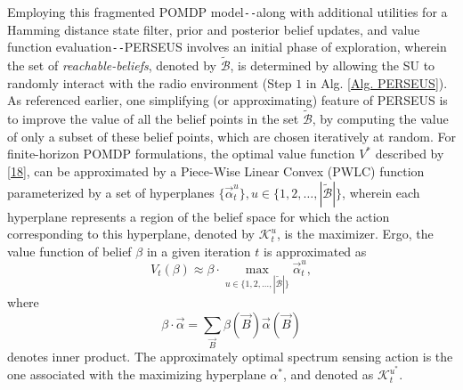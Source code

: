 \documentclass[10pt, twocolumn]{IEEEtran}
\begin{document}
Employing this fragmented POMDP model\texttt{-{}-}along with additional utilities for a Hamming distance state filter, prior and posterior belief updates, and value function evaluation\texttt{-{}-}PERSEUS involves an initial phase of exploration, wherein the set of \emph{reachable-beliefs}, denoted by $\tilde{\mathcal{B}}$, is determined by allowing the SU to randomly interact with the radio environment (Step $1$ in Alg. \ref{Alg. PERSEUS}). As referenced earlier, one simplifying (or approximating) feature of PERSEUS is to improve the value of all the belief points in the set $\tilde{\mathcal{B}}$, by computing the value of only a subset of these belief points, which are chosen iteratively at random. For finite-horizon POMDP formulations, the optimal value function $V^{*}$ described by \eqref{18}, can be approximated by a Piece-Wise Linear Convex (PWLC) function \cite{WCL:13} parameterized by a set of hyperplanes $\{\vec{\alpha}_{t}^{u}\},u{\in}\{1,2,\dots,|\tilde{\mathcal{B}}|\}$, wherein each hyperplane represents a region of the belief space for which the action corresponding to this hyperplane, denoted by $\mathcal{K}_{t}^{u}$, is the maximizer. Ergo, the value function of belief $\beta$ in a given iteration $t$ is approximated as
\begin{equation}\label{22}
    V_{t}(\beta) \approx \beta \cdot \max_{u \in \{1,2,\dots,|\tilde{\mathcal{B}}|\}} \vec{\alpha}_{t}^{u},
\end{equation}
where
\begin{equation}\label{24}
    \beta \cdot \vec{\alpha}=\sum_{\vec{B}}\beta(\vec{B})\vec{\alpha}(\vec{B})
\end{equation}
denotes inner product. The approximately optimal spectrum sensing action is the one associated with the maximizing hyperplane $\alpha^*$, and denoted as $\mathcal{K}_{t}^{u^{*}}$.
\end{document}

